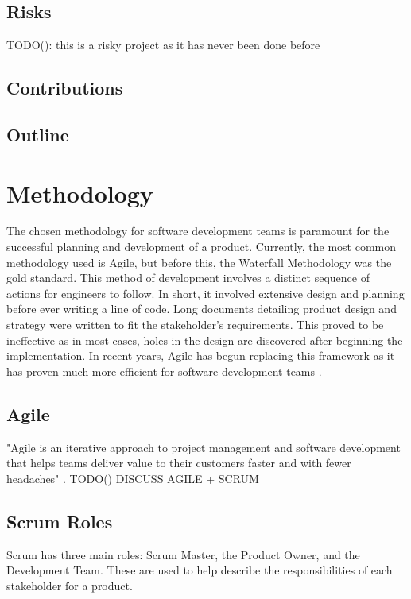 \documentclass{article}
\begin{document}
\subsection{Risks}
TODO(): this is a risky project as it has never been done before 



\subsection{Contributions}



\subsection{Outline}



\section{Methodology}
The chosen methodology for software development teams is paramount for the successful planning and development of a product. Currently, the most common methodology used is Agile, but before this, the Waterfall Methodology was the gold standard. This method of development involves a distinct sequence of actions for engineers to follow. In short, it involved extensive design and planning before ever writing a line of code. Long documents detailing product design and strategy were written to fit the stakeholder's requirements. This proved to be ineffective as in most cases, holes in the design are discovered after beginning the implementation. In recent years, Agile has begun replacing this framework as it has proven much more efficient for software development teams \cite{agile-waterfall}.



\subsection{Agile}
"Agile is an iterative approach to project management and software development that helps teams deliver value to their customers faster and with fewer headaches" \cite{what-is-agile}. TODO()
DISCUSS AGILE + SCRUM



\subsection{Scrum Roles}
Scrum has three main roles: Scrum Master, the Product Owner, and the Development Team. These are used to help describe the responsibilities of each stakeholder for a product.
\end{document}
